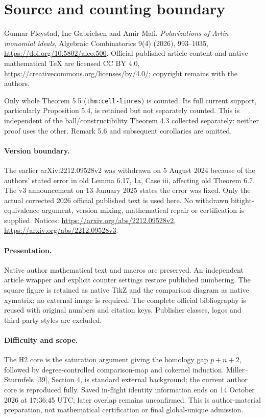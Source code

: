 \section*{Source and counting boundary}
Gunnar Fløystad, Ine Gabrielsen and Amir Mafi, \emph{Polarizations of Artin monomial ideals}, Algebraic Combinatorics 9(4) (2026), 993--1035, \url{https://doi.org/10.5802/alco.500}. Official published article content and native mathematical TeX are licensed CC BY 4.0, \url{https://creativecommons.org/licenses/by/4.0/}; copyright remains with the authors.

Only whole Theorem 5.5 (\texttt{thm:cell-linres}) is counted. Its full current support, particularly Proposition 5.4, is retained but not separately counted. This is independent of the ball/constructibility Theorem 4.3 collected separately: neither proof uses the other. Remark 5.6 and subsequent corollaries are omitted.

\paragraph{Version boundary.} The earlier arXiv:2212.09528v2 was withdrawn on 5 August 2024 because of the authors' stated error in old Lemma 6.17, 1a, Case iii, affecting old Theorem 6.7. The v3 announcement on 13 January 2025 states the error was fixed. Only the actual corrected 2026 official published text is used here. No withdrawn bitight-equivalence argument, version mixing, mathematical repair or certification is supplied. Notices: \url{https://arxiv.org/abs/2212.09528v2}, \url{https://arxiv.org/abs/2212.09528v3}.

\paragraph{Presentation.} Native author mathematical text and macros are preserved. An independent article wrapper and explicit counter settings restore published numbering. The square figure is retained as native TikZ and the comparison diagram as native xymatrix; no external image is required. The complete official bibliography is reused with original numbers and citation keys. Publisher classes, logos and third-party styles are excluded.

\paragraph{Difficulty and scope.} The H2 core is the saturation argument giving the homology gap $p+n+2$, followed by degree-controlled comparison-map and cokernel induction. Miller--Sturmfels [39], Section 4, is standard external background; the current author core is reproduced fully. Saved in-flight identity information ends on 14 October 2026 at 17:36:45 UTC; later overlap remains unconfirmed. This is author-material preparation, not mathematical certification or final global-unique admission.
